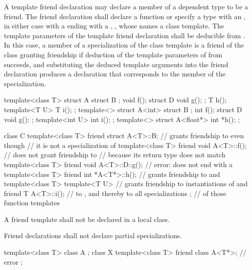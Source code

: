 \pnum
A template friend declaration may declare
a member of a dependent type to be a friend.
The friend declaration shall declare a function or
specify a type with an ,
in either case with a 
ending with a , ,
whose  names a class template.
The template parameters of the template friend declaration
shall be deducible from .
In this case,
a member of a specialization  of the class template
is a friend of the class granting friendship
if deduction of the template parameters
of  from  succeeds, and
substituting the deduced template arguments into the friend declaration
produces a declaration that corresponds to
the member of the specialization.
\begin{example}
\begin{codeblock}
template<class T> struct A {
  struct B { };
  void f();
  struct D {
    void g();
  };
  T h();
  template<T U> T i();
};
template<> struct A<int> {
  struct B { };
  int f();
  struct D {
    void g();
  };
  template<int U> int i();
};
template<> struct A<float*> {
  int *h();
};

class C {
  template<class T> friend struct A<T>::B;      // grants friendship to  even though
                                                // it is not a specialization of 
  template<class T> friend void A<T>::f();      // does not grant friendship to 
                                                // because its return type does not match
  template<class T> friend void A<T>::D::g();   // error:  does not end with a 
  template<class T> friend int *A<T*>::h();     // grants friendship to  and 
  template<class T> template<T U>               // grants friendship to instantiations of  and
    friend T A<T>::i();                         // to , and thereby to all specializations
};                                              // of those function templates
\end{codeblock}
\end{example}

\pnum
A friend template shall not be declared in a local class.

\pnum
Friend declarations shall not declare partial specializations.
\begin{example}
\begin{codeblock}
template<class T> class A { };
class X {
  template<class T> friend class A<T*>;         // error
};
\end{codeblock}
\end{example}

